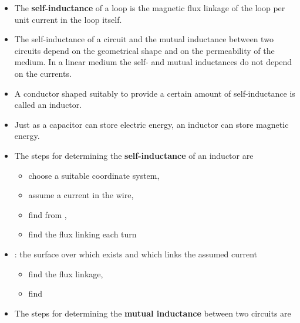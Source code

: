 \begin{ELunit}

\begin{itemize}
\tightlist
\item
  The \textbf{self-inductance} of a loop is the magnetic flux linkage of the loop per unit current in the loop itself.
\item
  The self-inductance of a circuit and the mutual inductance between two circuits depend on the geometrical shape and on the permeability of the medium. In a linear medium the self- and mutual inductances do not depend on the currents.
\item
  A conductor shaped suitably to provide a certain amount of self-inductance is called an inductor.
\item
  Just as a capacitor can store electric energy, an inductor can store magnetic energy.
\item
  The steps for determining the \textbf{self-inductance} of an inductor are

  \begin{itemize}
  \tightlist
  \item
    choose a suitable coordinate system,
  \item
    assume a current  in the wire,
  \item
    find  from ,
  \item
    find the flux linking each turn
  \end{itemize}
\end{itemize}


\begin{itemize}
\tightlist
\item
  : the surface over which  exists and which links the assumed current

  \begin{itemize}
  \tightlist
  \item
    find the flux linkage,
  \item
    find 
  \end{itemize}
\end{itemize}


\begin{itemize}
\tightlist
\item
  The steps for determining the \textbf{mutual inductance} between two circuits are


\end{itemize}
\end{ELunit}
